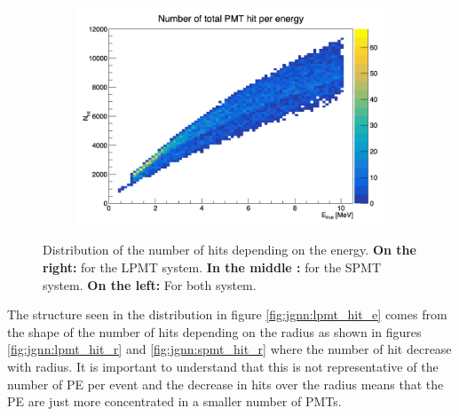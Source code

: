 \documentclass[../main.tex]{subfiles}
\begin{document}
\begin{figure}[ht]
\begin{subfigure}[t]{0.32\linewidth}
    \caption{}
    \label{fig:jgnn:spmt_hit_e}
  \end{subfigure}
  \begin{subfigure}[t]{0.32\linewidth}
    \centering
    \includegraphics[width=\linewidth]{images/jgnn/tot_hit_e.png}
    \caption{}
    \label{fig:jgnn:tot_hit_e}
  \end{subfigure}
  \caption{Distribution of the number of hits depending on the energy. \textbf{On the right:} for the LPMT system. \textbf{In the middle :} for the SPMT system. \textbf{On the left: } For both system.}
\end{figure}

The structure seen in the distribution in figure \ref{fig:jgnn:lpmt_hit_e} comes from the shape of the number of hits depending on the radius as shown in figures \ref{fig:jgnn:lpmt_hit_r} and \ref{fig:jgnn:spmt_hit_r} where the number of hit decrease with radius. It is important to understand that this is not representative of the number of PE per event and the decrease in hits over the radius means that the PE are just more concentrated in a smaller number of PMTs.
\end{document}
